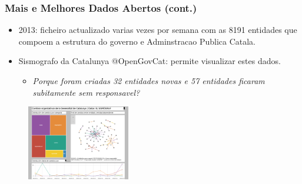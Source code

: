 \documentclass[hyperref={pdfpagelabels=true}]{beamer}
\begin{document}
\begin{frame}
\frametitle{Mais e Melhores Dados Abertos (cont.)}

    \small{
    \begin{itemize}
        \item<2->2013: ficheiro actualizado varias vezes por semana com as 8191 entidades que compoem a estrutura do governo e Adminstracao Publica Catala.
        \item<3->Sismografo da Catalunya @OpenGovCat: permite visualizar estes dados.
        \begin{itemize}%
            \item<4->\textit{Porque foram criadas 32 entidades novas e 57 entidades ficaram subitamente sem responsavel?}
        \end{itemize}                    
    \end{itemize}                      
        }
        \begin{figure}   
            \includegraphics[width=0.4\textwidth]{sism.png}%
        \end{figure} 
    
\end{frame}
\end{document}
